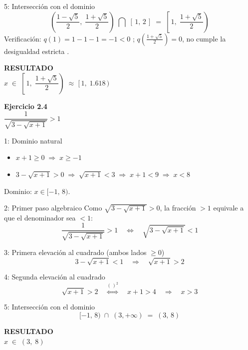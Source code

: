 \documentclass[letterpaper, 11pt]{article}
\newcommand{\exheader}[2]{%
    \begin{tcolorbox}[colback=azulFuerte!12, colframe=azulFuerte,
        arc=8pt, boxrule=1.5pt, enhanced]
        {\large\textbf{\color{azulFuerte}Ejercicio #1}} \\[0.4em]
        \centering\LARGE $\displaystyle #2$
    \end{tcolorbox}
    \smallskip}
\newcommand{\resultado}[1]{%
    \begin{tcolorbox}[colback=azulFuerte, colframe=azulFuerte, colupper=white,
        arc=8pt, boxrule=1.5pt, enhanced, drop shadow={black!12}]
        \centering\large\textbf{RESULTADO} \\[0.4em]
        \LARGE $\displaystyle #1$
    \end{tcolorbox}}
\begin{document}
\begin{paso}{5: Intersección con el dominio}
\[
    \left(\frac{1-\sqrt{5}}{2},\;\frac{1+\sqrt{5}}{2}\right)
    \;\bigcap\;[\,1,\,2\,]
    \;=\;
    \left[\,1,\;\frac{1+\sqrt{5}}{2}\right)
\]
Verificación: $q(1)=1-1-1=-1<0$ \checkmark;\quad
$q\!\left(\tfrac{1+\sqrt5}{2}\right)=0$, no cumple la desigualdad estricta \checkmark.
\end{paso}

\resultado{x \;\in\; \left[\,1,\;\dfrac{1+\sqrt{5}}{2}\right) \;\approx\; [\,1,\;1.618\,)}

\clearpage

\exheader{2.4}{\dfrac{1}{\sqrt{3 - \sqrt{x+1}}} > 1}

\begin{paso}{1: Dominio natural}
\begin{itemize}[itemsep=0.2em]
    \item $x + 1 \geq 0 \;\Rightarrow\; x \geq -1$
    \item $3 - \sqrt{x+1} > 0 \;\Rightarrow\; \sqrt{x+1} < 3 \;\Rightarrow\; x+1 < 9 \;\Rightarrow\; x < 8$
\end{itemize}
Dominio: $x \in [-1,\,8)$.
\end{paso}

\begin{paso}{2: Primer paso algebraico}
Como $\sqrt{3-\sqrt{x+1}} > 0$, la fracción $> 1$ equivale a que el denominador sea $< 1$:
\[
    \frac{1}{\sqrt{3-\sqrt{x+1}}} > 1
    \quad\Longleftrightarrow\quad
    \sqrt{3-\sqrt{x+1}} < 1
\]
\end{paso}

\begin{paso}{3: Primera elevación al cuadrado (ambos lados $\geq 0$)}
\[
    3 - \sqrt{x+1} < 1
    \quad\Longrightarrow\quad
    \sqrt{x+1} > 2
\]
\end{paso}

\begin{paso}{4: Segunda elevación al cuadrado}
\[
    \sqrt{x+1} > 2
    \quad\stackrel{(\,)^2}{\Longleftrightarrow}\quad
    x + 1 > 4
    \quad\Longrightarrow\quad
    x > 3
\]
\end{paso}

\begin{paso}{5: Intersección con el dominio}
\[
    [-1,\,8) \;\cap\; (3,+\infty) \;=\; (3,\,8)
\]
\end{paso}

\resultado{x \;\in\; (3,\;8)}
\end{document}
